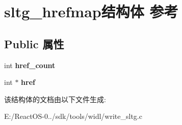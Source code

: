\hypertarget{structsltg__hrefmap}{}\section{sltg\+\_\+hrefmap结构体 参考}
\label{structsltg__hrefmap}
\subsection*{Public 属性}
\begin{DoxyCompactItemize}
\item 
\mbox{\label{structsltg__hrefmap_a198487d89c85f5a5a518e109a35f9896}} 
int {\bfseries href\+\_\+count}
\item 
\mbox{\label{structsltg__hrefmap_abae2b82effe525a9f38a2b6da5b5bef8}} 
int $\ast$ {\bfseries href}
\end{DoxyCompactItemize}


该结构体的文档由以下文件生成\+:\begin{DoxyCompactItemize}
\item 
E\+:/\+React\+O\+S-\/0../sdk/tools/widl/write\+\_\+sltg.\+c\end{DoxyCompactItemize}
